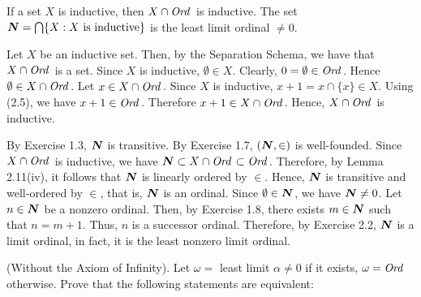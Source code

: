  If a set $X$ is inductive, then $X \cap \textit{Ord\,}$ is inductive. The set 
$\boldsymbol{N} = \bigcap \{ X : X \text{ is inductive} \}$ is the least limit ordinal 
$\neq 0$.
\begin{solution}
Let $X$ be an inductive set. Then, by the Separation Schema, we have that 
$X \cap \textit{Ord\,}$ is a set. Since $X$ is inductive, $\emptyset \in X$. Clearly, 
$0 = \emptyset \in \textit{Ord\,}$. Hence $\emptyset \in X \cap \textit{Ord\,}$. Let 
$x \in X \cap \textit{Ord\,}$. Since $X$ is inductive, $x + 1 = x \cap \{ x \} \in X$. 
Using (2.5), we have $x + 1 \in \textit{Ord\,}$. Therefore $x + 1 \in X \cap \textit{Ord\,}$. 
Hence, $X \cap \textit{Ord\,}$ is inductive. 

By Exercise 1.3, $\boldsymbol{N}$ is transitive. By Exercise 1.7, $(\boldsymbol{N}, \in)$ is 
well-founded. Since $X \cap \textit{Ord\,}$ is inductive, we have 
$\boldsymbol{N} \subset X \cap \textit{Ord\,} \subset \textit{Ord\,}$. Therefore, by Lemma 2.11(iv), it follows
that $\boldsymbol{N}$ is linearly ordered by $\in$. Hence, $\boldsymbol{N}$ is transitive and 
well-ordered by $\in$, that is, $\boldsymbol{N}$ is an ordinal. Since $\emptyset \in \boldsymbol{N}$, 
we have $\boldsymbol{N} \neq 0$. Let $n \in \boldsymbol{N}$ be a nonzero ordinal. Then, by Exercise 
1.8, there exists $m \in \boldsymbol{N}$ such that $n = m + 1$. Thus, $n$ is a successor 
ordinal. Therefore, by Exercise 2.2, $\boldsymbol{N}$ is a limit ordinal, in fact, it is 
the least nonzero limit ordinal.
\end{solution}

 (Without the Axiom of Infinity). Let $\omega =$ least limit 
$\alpha \neq 0$ if it exists, $\omega = \textit{Ord\,}$ otherwise. Prove that the 
following statements are equivalent:

